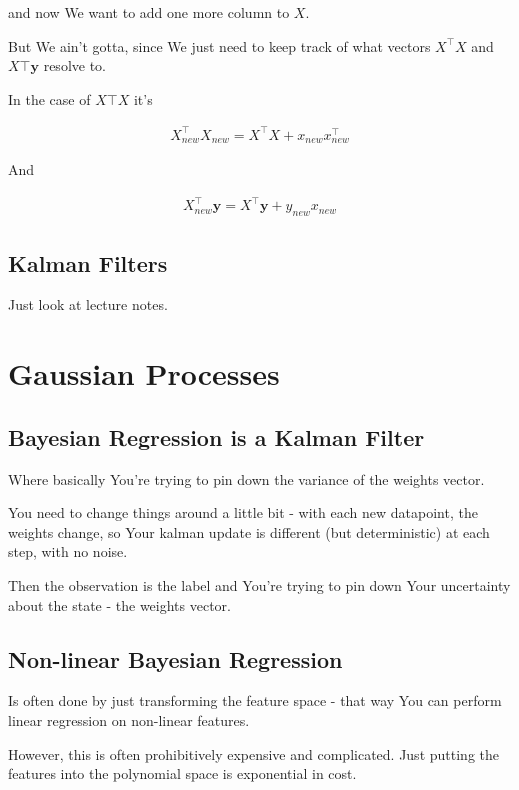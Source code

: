 \documentclass{article}
\begin{document}
		and now We want to add one more column to $X$.
		
		But We ain't gotta, since We just need to keep track of what vectors $X^\top X$ and $X\top\mathbf{y}$ resolve to.
		
		In the case of $X\top X$ it's
		
		\begin{align}
			X_{new}^\top X_{new} = X^\top X + x_{new}x_{new}^\top
		\end{align}
		
		And 
		
		\begin{align}
			X_{new}^\top\mathbf{y} = X^\top\mathbf{y} + y_{new}x_{new}
		\end{align}
		
		
	\subsection{Kalman Filters}
	
		Just look at lecture notes.
		
\section{Gaussian Processes}

	\subsection{Bayesian Regression is a Kalman Filter}
	
		Where basically You're trying to pin down the variance of the weights vector.
		
		You need to change things around a little bit - with each new datapoint, the weights change, so Your kalman update is different (but deterministic) at each step, with no noise.
		
		Then the observation is the label and You're trying to pin down Your uncertainty about the state - the weights vector.
		
	\subsection{Non-linear Bayesian Regression}
	
		Is often done by just transforming the feature space - that way You can perform linear regression on non-linear features.
		
		However, this is often prohibitively expensive and complicated. Just putting the features into the polynomial space is exponential in cost.
		
\end{document}
